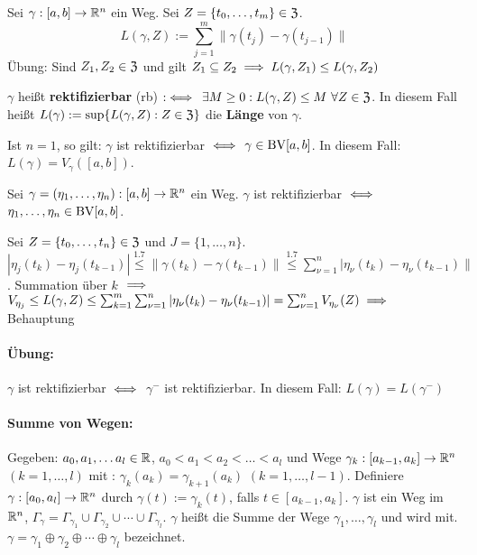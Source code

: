 \documentclass[a4paper,oneside,DIV15,BCOR12mm,chapterprefix=true,headings=onelinechapter]{scrbook}
\begin{document}
\begin{definition}
Sei $\gamma:[a,b]\to \mathbb{R}^n$ ein Weg. Sei $Z=\{t_0, \ldots, t_m\} \in \mathfrak{Z}$.\\
$$L(\gamma,Z):= \sum_{j=1}^m\|\gamma(t_j) - \gamma(t_{j-1})\|$$
Übung: Sind $Z_1,Z_2\in\mathfrak{Z}$ und gilt $Z_1 \subseteq Z_2 \implies L(\gamma,Z_1) \le L(\gamma,Z_2)$

$\gamma$ heißt \textbf{rektifizierbar} (rb)  $:\iff$ $\exists M\ge0: L(\gamma,Z)\le M\ \forall Z\in\mathfrak{Z}$. In diesem Fall heißt $L(\gamma) := \sup\{L(\gamma,Z): Z\in\mathfrak{Z}\}$ die \textbf{Länge} von $\gamma$.

Ist $n=1$, so gilt: $\gamma$ ist rektifizierbar $\iff$ $\gamma\in \text{BV}[a,b]$. In diesem Fall: $L(\gamma) = V_\gamma([a,b])$.
\end{definition}

\begin{satz}
Sei $\gamma = (\eta_1, \ldots, \eta_n):[a,b]\to\mathbb{R}^n$ ein Weg. $\gamma$ ist rektifizierbar $\iff$ \mbox{$\eta_1,\ldots,\eta_n\in \text{BV}[a,b]$}.
\end{satz}

\begin{beweis}
Sei $Z = \{t_0,\ldots,t_n\} \in \mathfrak{Z}$ und $J=\{1,\ldots,n\}$.\\
$|\eta_j(t_k)-\eta_j(t_{k-1})| \stackrel{\text{1.7}}{\le} \|\gamma(t_k) - \gamma(t_{k-1})\| \stackrel{\text{1.7}}\le \sum_{\nu=1}^n |\eta_\nu(t_k) - \eta_\nu(t_{k-1})\|$. Summation über $k$ $\implies$ $V_{\eta_j} \le L(\gamma,Z) \le \sum_{k=1}^m\sum_{\nu=1}^n |\eta_\nu(t_k)-\eta_\nu(t_{k-1})| = \sum_{\nu=1}^n V_{\eta_\nu}(Z) \implies$ Behauptung
\end{beweis}
\paragraph{Übung:} $\gamma$ ist rektifizierbar $\iff$ $\gamma^-$ ist rektifizierbar. In diesem Fall: \mbox{$L(\gamma) = L(\gamma^-)$}

\paragraph{Summe von Wegen:}Gegeben: $a_0, a_1,\ldots a_l \in \mathbb{R}$, $a_0<a_1<a_2<\ldots<a_l$ und Wege $\gamma_k:[a_{k-1},a_k] \to \mathbb{R}^n$ $(k=1,\ldots,l)$ mit : $\gamma_k(a_k) = \gamma_{k+1}(a_k)$ $(k=1,\ldots,l-1)$.
Definiere $\gamma:[a_0,a_l]\to\mathbb{R}^n$ durch $\gamma(t):=\gamma_k(t)$, falls $t\in[a_{k-1},a_k]$. $\gamma$ ist ein Weg im $\mathbb{R}^n$, $\Gamma_\gamma = \Gamma_{\gamma_1} \cup \Gamma_{\gamma_2} \cup \cdots \cup \Gamma_{\gamma_l}$. $\gamma$ heißt die Summe der Wege $\gamma_1,\ldots,\gamma_l$ und wird mit. $\gamma = \gamma_1 \oplus \gamma_2 \oplus \cdots \oplus \gamma_l$ bezeichnet. 
\end{document}
